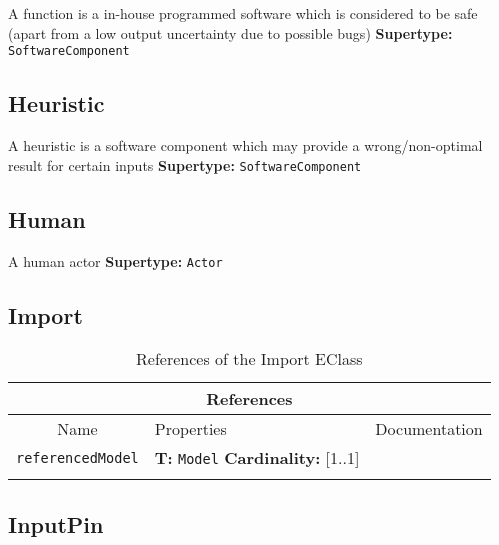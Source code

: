 \documentclass{article}
\begin{document}
A function is a in-house programmed software which is considered to be safe (apart from a low output uncertainty due to possible bugs)
\textbf{Supertype: }\texttt{SoftwareComponent}
\subsection[Heuristic]{Heuristic}
\label{e4smHeuristic}

A heuristic is a software component which may provide a wrong/non-optimal result for certain inputs
\textbf{Supertype: }\texttt{SoftwareComponent}
\subsection[Human]{Human}
\label{e4smHuman}

A human actor
\textbf{Supertype: }\texttt{Actor}
\subsection[Import]{Import}
\label{e4smImport}

\begin{table}[H]
\footnotesize
\begin{tabularx}{\textwidth}{|c| p{4 cm} | X |}
\hline
\multicolumn{3}{|c|}{\textbf{References}} \\
\hline
Name & Properties & Documentation \\ \hline \hline
\texttt{referencedModel}
 & 
\textbf{T:} \texttt{Model}
\newline
\textbf{Cardinality:} [1..1]
 & \\ \hline
\caption{References of the Import EClass}
\end{tabularx}
\label{e4smImportref}
\end{table}
\subsection[InputPin]{InputPin}
\label{e4smInputPin}
\end{document}
